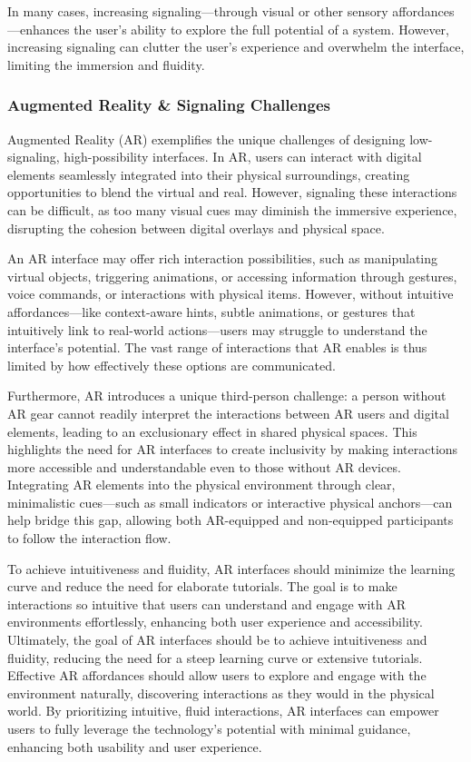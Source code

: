 In many cases, increasing signaling—through visual or other sensory affordances—enhances the user's ability to explore the full potential of a system.
However, increasing signaling can clutter the user's experience and overwhelm the interface, limiting the immersion and fluidity.

\subsubsection{ Augmented Reality \& Signaling Challenges}

Augmented Reality (AR) exemplifies the unique challenges of designing low-signaling, high-possibility interfaces\cite{10.1145/2254556.2254569}.
In AR, users can interact with digital elements seamlessly integrated into their physical surroundings, creating opportunities to blend the virtual and real.
However, signaling these interactions can be difficult, as too many visual cues may diminish the immersive experience, disrupting the cohesion between digital overlays and physical space.

An AR interface may offer rich interaction possibilities, such as manipulating virtual objects, triggering animations, or accessing information through gestures, voice commands, or interactions with physical items.
However, without intuitive affordances—like context-aware hints, subtle animations, or gestures that intuitively link to real-world actions—users may struggle to understand the interface’s potential.
The vast range of interactions that AR enables is thus limited by how effectively these options are communicated.

Furthermore, AR introduces a unique third-person challenge: a person without AR gear cannot readily interpret the interactions between AR users and digital elements, leading to an exclusionary effect in shared physical spaces.
This highlights the need for AR interfaces to create inclusivity by making interactions more accessible and understandable even to those without AR devices.
Integrating AR elements into the physical environment through clear, minimalistic cues—such as small indicators or interactive physical anchors—can help bridge this gap, allowing both AR-equipped and non-equipped participants to follow the interaction flow.

To achieve intuitiveness and fluidity, AR interfaces should minimize the learning curve and reduce the need for elaborate tutorials.
The goal is to make interactions so intuitive that users can understand and engage with AR environments effortlessly, enhancing both user experience and accessibility.
Ultimately, the goal of AR interfaces should be to achieve intuitiveness and fluidity, reducing the need for a steep learning curve or extensive tutorials.
Effective AR affordances should allow users to explore and engage with the environment naturally, discovering interactions as they would in the physical world.
By prioritizing intuitive, fluid interactions, AR interfaces can empower users to fully leverage the technology’s potential with minimal guidance, enhancing both usability and user experience.


